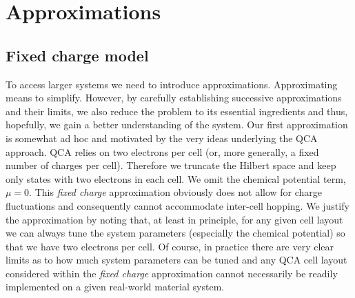 \chapter{Approximations}
\graphicspath{{../gfx/chapter02/}{../plots/chapter02/}}



\section{Fixed charge model}

To access larger systems we need to introduce approximations. Approximating
means to simplify. However, by carefully establishing successive approximations
and their limits, we also reduce the problem to its essential ingredients and
thus, hopefully, we gain a better understanding of the system. Our first
approximation is somewhat ad hoc and motivated by the very ideas underlying the
QCA approach. QCA relies on two electrons per cell (or, more generally, a fixed
number of charges per cell). Therefore we truncate the Hilbert space and keep
only states with two electrons in each cell. We omit the chemical potential
term, $\mu = 0$. This \emph{fixed charge} approximation obviously does not allow
for charge fluctuations and consequently cannot accommodate inter-cell hopping.
We justify the approximation by noting that, at least in principle, for any
given cell layout we can always tune the system parameters (especially the chemical
potential) so that we have two electrons per cell. Of course, in practice there
are very clear limits as to how much system parameters can be tuned and any QCA
cell layout considered within the \emph{fixed charge} approximation cannot
necessarily be readily implemented on a given real-world material system.

